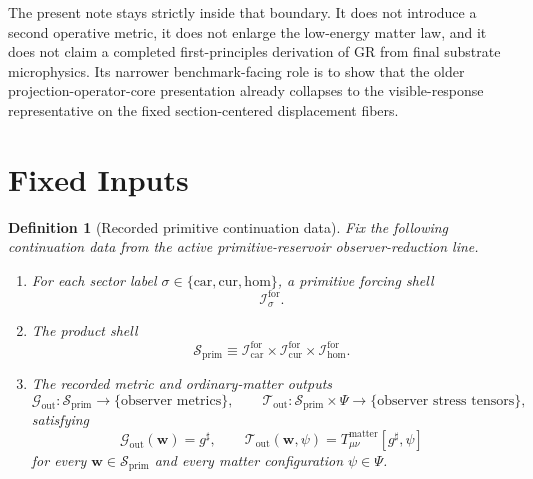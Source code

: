 \documentclass[11pt]{article}
\newcommand{\CompletedMetric}{g^{\sharp}}
\newcommand{\MatterSpace}{\Psi}
\newcommand{\Car}{\mathrm{car}}
\newcommand{\Cur}{\mathrm{cur}}
\newcommand{\Hom}{\mathrm{hom}}
\newcommand{\ForSpace}[1]{\mathcal I_{#1}^{\mathrm{for}}}
\newcommand{\PrimShell}{\mathcal S_{\mathrm{prim}}}
\newcommand{\MetricOut}{\mathscr G_{\mathrm{out}}}
\newcommand{\MatterOut}{\mathscr T_{\mathrm{out}}}
\newtheorem{definition}{Definition}
\begin{document}
The present note stays strictly inside that boundary. It does not introduce a second operative metric, it does not enlarge the low-energy matter law, and it does not claim a completed first-principles derivation of GR from final substrate microphysics. Its narrower benchmark-facing role is to show that the older projection-operator-core presentation already collapses to the visible-response representative on the fixed section-centered displacement fibers.

\section{Fixed Inputs}

\begin{definition}[Recorded primitive continuation data]
\label{def:fixed}
Fix the following continuation data from the active primitive-reservoir observer-reduction line.
\begin{enumerate}
    \item For each sector label \(\sigma\in\{\Car,\Cur,\Hom\}\), a primitive forcing shell
    \[
    \ForSpace{\sigma}.
    \]
    \item The product shell
    \[
    \PrimShell
    \equiv
    \ForSpace{\Car}\times \ForSpace{\Cur}\times \ForSpace{\Hom}.
    \]
    \item The recorded metric and ordinary-matter outputs
    \[
    \MetricOut:\PrimShell\to\{\text{observer metrics}\},
    \qquad
    \MatterOut:\PrimShell\times\MatterSpace\to\{\text{observer stress tensors}\},
    \]
    satisfying
    \begin{equation}
    \MetricOut(\mathbf w)=\CompletedMetric,
    \qquad
    \MatterOut(\mathbf w,\psi)
    =
    T_{\mu\nu}^{\mathrm{matter}}[\CompletedMetric,\psi]
    \label{eq:fixedoutputs}
    \end{equation}
    for every \(\mathbf w\in\PrimShell\) and every matter configuration \(\psi\in\MatterSpace\).
\end{enumerate}
\end{definition}
\end{document}
